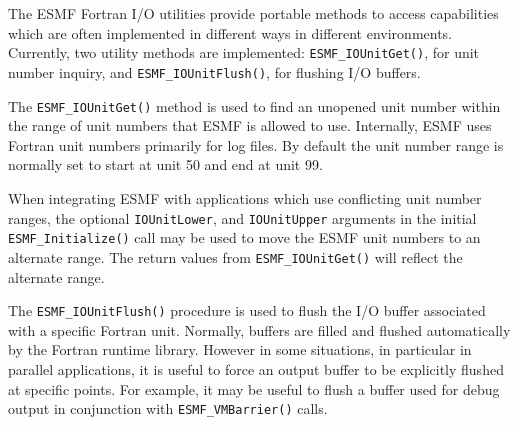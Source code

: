 
The ESMF Fortran I/O utilities provide portable methods to access
capabilities which are often implemented in different
ways in different environments.  Currently, two utility
methods are implemented: {\tt ESMF\_IOUnitGet()}, for unit
number inquiry, and {\tt ESMF\_IOUnitFlush()}, for flushing I/O
buffers.


The {\tt ESMF\_IOUnitGet()} method is used to find an unopened
unit number within the range of unit numbers that ESMF
is allowed to use.  Internally, ESMF uses Fortran unit
numbers primarily for log files.  By default the unit number range
is normally set to start at unit 50 and end at unit 99.


When integrating ESMF with applications which use conflicting
unit number ranges, the optional {\tt IOUnitLower}, and
{\tt IOUnitUpper} arguments in the initial {\tt ESMF\_Initialize()} call
may be used to move the ESMF unit numbers to an alternate range.
The return values from {\tt ESMF\_IOUnitGet()} will reflect the
alternate range.


The {\tt ESMF\_IOUnitFlush()} procedure is used to flush the
I/O buffer associated with a specific Fortran unit.  Normally,
buffers are filled and flushed automatically by the Fortran
runtime library.  However in some situations, in particular
in parallel applications, it is useful to force an output
buffer to be explicitly flushed at specific points.  For example,
it may be useful to flush a buffer used for debug output
in conjunction with {\tt ESMF\_VMBarrier()} calls.
